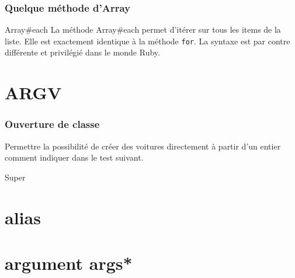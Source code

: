 \documentclass{beamer}
\begin{document}
\begin{frame}
  \frametitle{Quelque m\'ethode d'Array}
  \begin{block}{Array#each}
    La m\'ethode Array#each permet d'it\'erer sur tous les items de la liste.
    Elle est exactement identique à la m\'ethode \verb?for?. La syntaxe est par contre diff\'erente et privil\'egi\'e dans le monde Ruby.
  \end{block}
\end{frame}

\section{ARGV}


\begin{frame}
  \frametitle{Ouverture de classe}
  Permettre la possibilit\'e de cr\'eer des voitures directement à partir d'un entier comment indiquer dans le test suivant.
\end{frame}
\begin{frame}
  \begin{beamerboxesrounded}{Super}
    
  \end{beamerboxesrounded}
\end{frame}

\section{alias}
\section{argument args*}
\end{document}
